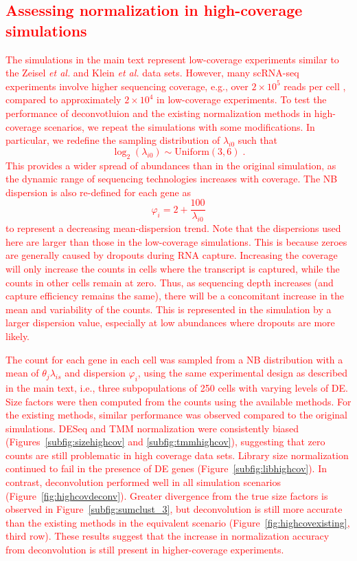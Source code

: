 \documentclass{article}
\newcommand\revised[1]{\textcolor{red}{#1}}
\begin{document}
\revised{\section{Assessing normalization in high-coverage simulations}
The simulations in the main text represent low-coverage experiments similar to the Zeisel \textit{et al.} and Klein \textit{et al.} data sets.
However, many scRNA-seq experiments involve higher sequencing coverage, e.g., over $2\times 10^5$ reads per cell \cite{saraiva2015hierarchical,kolod2015single}, compared to approximately $2\times10^4$ in low-coverage experiments.
To test the performance of deconvotluion and the existing normalization methods in high-coverage scenarios, we repeat the simulations with some modifications.
In particular, we redefine the sampling distribution of $\lambda_{i0}$ such that 
\[
    \log_2(\lambda_{i0}) \sim \mbox{Uniform}(3, 6) \;.
\]
This provides a wider spread of abundances than in the original simulation, as the dynamic range of sequencing technologies increases with coverage.
The NB dispersion is also re-defined for each gene as 
\[
    \varphi_i = 2 + \frac{100}{\lambda_{i0}}
\]
to represent a decreasing mean-dispersion trend.
Note that the dispersions used here are larger than those in the low-coverage simulations.
This is because zeroes are generally caused by dropouts during RNA capture.
Increasing the coverage will only increase the counts in cells where the transcript is captured, while the counts in other cells remain at zero.
Thus, as sequencing depth increases (and capture efficiency remains the same), there will be a concomitant increase in the mean and variability of the counts.
This is represented in the simulation by a larger dispersion value, especially at low abundances where dropouts are more likely.}

\revised{The count for each gene in each cell was sampled from a NB distribution with a mean of $\theta_{j}\lambda_{is}$ and dispersion $\varphi_i$, using the same experimental design as described in the main text, i.e., three subpopulations of 250 cells with varying levels of DE.
Size factors were then computed from the counts using the available methods.
For the existing methods, similar performance was observed compared to the original simulations.
DESeq and TMM normalization were consistently biased (Figures~\ref{subfig:sizehighcov} and \ref{subfig:tmmhighcov}), suggesting that zero counts are still problematic in high coverage data sets.
Library size normalization continued to fail in the presence of DE genes (Figure~\ref{subfig:libhighcov}).
In contrast, deconvolution performed well in all simulation scenarios (Figure~\ref{fig:highcovdeconv}).
Greater divergence from the true size factors is observed in Figure~\ref{subfig:sumclust_3}, but deconvolution is still more accurate than the existing methods in the equivalent scenario (Figure~\ref{fig:highcovexisting}, third row).
These results suggest that the increase in normalization accuracy from deconvolution is still present in higher-coverage experiments.
}
\end{document}
